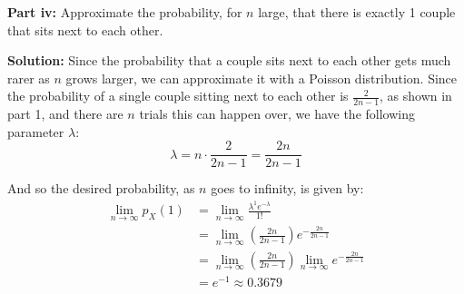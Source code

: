 \documentclass{article}
\begin{document}
\noindent\textbf{Part iv:} Approximate the probability, for $n$ large, that there is exactly 1 couple that sits next to each other.
\bigskip

\noindent\textbf{Solution:} Since the probability that a couple sits next to each other gets much rarer as $n$ grows larger, we can approximate it with a Poisson distribution. Since the probability of a single couple sitting next to each other is $\frac{2}{2n-1}$, as shown in part 1, and there are $n$ trials this can happen over, we have the following parameter $\lambda$:
\begin{equation*}
    \lambda=n\cdot\frac{2}{2n-1}=\frac{2n}{2n-1}
\end{equation*}
\smallskip

And so the desired probability, as $n$ goes to infinity, is given by:
\begin{align*}
    \lim_{n\to\infty}p_X(1)&=\lim_{n\to\infty}\frac{\lambda^1e^{-\lambda}}{1!}\tag{Poisson distribution}\\
    &=\lim_{n\to\infty}\left(\frac{2n}{2n-1}\right)e^{-\frac{2n}{2n-1}}\\
    &=\lim_{n\to\infty}\left(\frac{2n}{2n-1}\right)\lim_{n\to\infty}e^{-\frac{2n}{2n-1}}\\
    &=e^{-1}\approx0.3679\tag{limit of rational function}
\end{align*}

\end{document}
